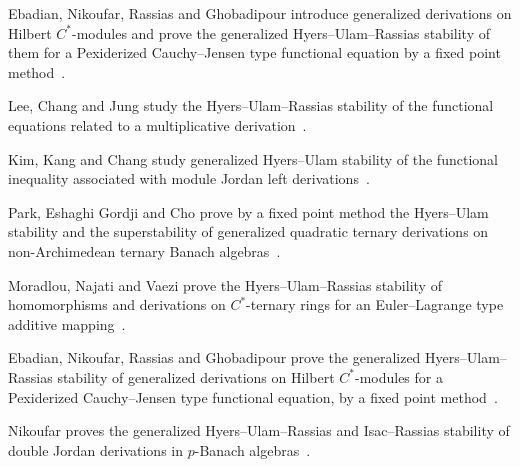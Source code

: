 Ebadian, Nikoufar, Rassias and Ghobadipour introduce generalized derivations on Hilbert $C^*$-modules and prove the generalized Hyers--Ulam--Rassias stability of them for a Pexiderized Cauchy--Jensen type functional equation by a fixed point method~\cite{WlStabilityOfGeneralizedDerivati2012}.

Lee, Chang and Jung study the Hyers--Ulam--Rassias stability of the functional equations related to a multiplicative derivation~\cite{WlOnStabilityOfTheFunctionalEqua2007}.

Kim, Kang and Chang study generalized Hyers--Ulam stability of the functional inequality associated with module Jordan left derivations~\cite{WlOnFunctionalInequalitiesOrigin2008}.

Park, Eshaghi Gordji and Cho prove by a fixed point method the Hyers--Ulam stability and the superstability of generalized quadratic ternary derivations on non-Archimedean ternary Banach algebras~\cite{WlStabilityAndSuperstabilityOfGe2012}.

Moradlou, Najati and Vaezi prove the Hyers--Ulam--Rassias stability of homomorphisms and derivations on $C^*$-ternary rings for an Euler--Lagrange type additive mapping~\cite{WlStabilityOfHomomorphismsAndDer2020}.

Ebadian, Nikoufar, Rassias and Ghobadipour prove the generalized Hyers--Ulam--Rassias stability of generalized derivations on Hilbert $C^*$-modules for a Pexiderized Cauchy--Jensen type functional equation, by a fixed point method~\cite{WlStabilityOfGeneralizedDerivati2020}.

Nikoufar proves the generalized Hyers--Ulam--Rassias and Isac--Rassias stability of double Jordan derivations in $p$-Banach algebras~\cite{WlFunctionsNearSome1212DoubleJor2020}.
